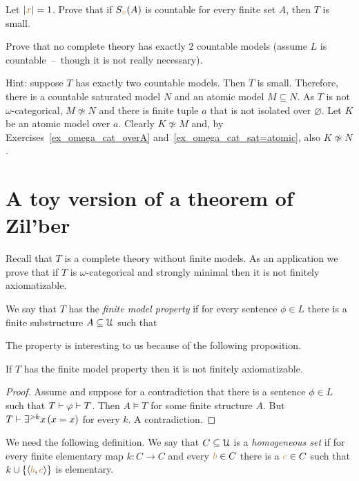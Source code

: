 
\begin{exercise}
Let $|{\color{brown} x}|=1$.
Prove that if $S_{{\color{brown} x}}(A)$ is countable for every finite set $A$, then $T$ is small.
\end{exercise}


\begin{exercise}[ (Vaught)]
Prove that no complete theory has exactly 2 countable models (assume $L$ is countable~--~though it is not really necessary).

Hint: suppose $T$ has exactly two countable models.
Then $T$ is small. 
Therefore, there is a countable saturated model $N$ and an atomic model $M\subseteq N$.
As $T$ is not $\omega$-categorical, $M\not\simeq N$ and there is finite tuple $a$ that is not isolated over $\varnothing$.
Let $K$ be an atomic model over $a$.
Clearly $K\not\simeq M$ and, by Exercises~\ref{ex_omega_cat_overA} and~\ref{ex_omega_cat_sat=atomic}, also $K\not\simeq N$.
\end{exercise}

\section{A toy version of a theorem of Zil'ber}\label{toy}

Recall that $T$ is a complete theory without finite models.
As an application we prove that if $T$ is $\omega$-categorical and strongly minimal then it is not finitely axiomatizable.

We say that $T$ has the \emph{finite model property\/} if for every sentence $\phi\in L$ there is a finite substructure $A\subseteq\EuScript U$ such that 


The property is interesting to us because of the following proposition.

\begin{proposition}\label{prop_fmp_fa}
If $T$ has the finite model property then it is not finitely axiomatizable.
\end{proposition}
\begin{proof}
Assume  and suppose for a contradiction that there is a sentence $\phi\in L$ such that $T\vdash\varphi\vdash T$.
Then $A\models T$ for some finite structure $A$.
But $T\vdash \exists^{>k}x\,(x=x)$ for every $k$.
A contradiction.
\end{proof}
We need the following definition.
We say that $C\subseteq\EuScript U$ is a \emph{homogeneous set\/} if for every finite elementary map $k:C\to C$ and every ${\color{brown} b}\in C$ there is a ${\color{brown} c}\in C$ such that $k\cup\{\langle{\color{brown}b},{\color{brown} c}\rangle\}$ is elementary.

